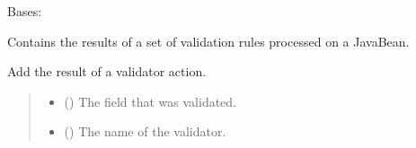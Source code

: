 \documentclass[letterpaper,10pt,english]{sphinxmanual}
\begin{document}
\begin{fulllineitems}
\label{\detokenize{apache_commons_validator_python:apache_commons_validator_python.validator_results_new.ValidatorResults}}
\pysigstartsignatures
{}
\pysigstopsignatures
\sphinxAtStartPar
Bases: 

\sphinxAtStartPar
Contains the results of a set of validation rules processed on a JavaBean.

\begin{fulllineitems}
\label{\detokenize{apache_commons_validator_python:apache_commons_validator_python.validator_results_new.ValidatorResults.add}}
\pysigstartsignatures
{}
\pysigstopsignatures
\sphinxAtStartPar
Add the result of a validator action.
\begin{quote}\begin{description}
\begin{itemize}
\item {} 
\sphinxAtStartPar
{} ({\hyperref[\detokenize{apache_commons_validator_python:apache_commons_validator_python.field_new.Field}]{}}) \textendash{} The field that was validated.

\item {} 
\sphinxAtStartPar
{} () \textendash{} The name of the validator.


\end{itemize}
\end{description}
\end{quote}
\end{fulllineitems}
\end{fulllineitems}
\end{document}
